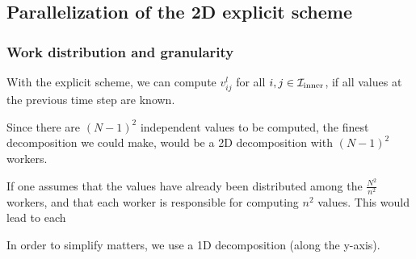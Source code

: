 \subsection{Parallelization of the 2D explicit scheme}
\subsubsection{Work distribution and granularity}
\cite{inf3380_bok}
With the explicit scheme, we can compute $v_{ij}^l$ for all $i, j \in \mathcal{I}_{\mathrm{inner}}$, if all values at the previous time step are known.

Since there are $(N - 1)^2$ independent values to be computed, the finest decomposition we could make, would be a 2D decomposition with $(N - 1)^2$ workers.

If one assumes that the values have already been distributed among the $\frac{N^2}{n^2}$ workers, and that each worker is responsible for computing $n^2$ values. This would lead to each

In order to simplify matters, we use a 1D decomposition (along the y-axis).
